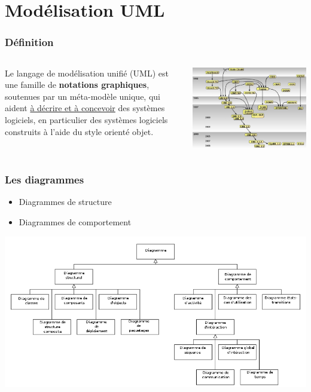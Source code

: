 \section{Modélisation UML}
\label{sec:uml}


\begin{frame}
    \frametitle{Définition}
    \begin{columns}
        \begin{column}{0.5\textwidth}
            Le langage de modélisation unifié (UML) est une famille de \textbf{notations graphiques},
            soutenues par un méta-modèle unique,
            qui aident \underline{à décrire et à concevoir} des systèmes logiciels,
            en particulier des systèmes logiciels construits à l'aide du style orienté objet.
        \end{column}
        \begin{column}{0.5\textwidth}
            \centering
            \includegraphics[width=\linewidth]{figures/uml/uml-historie}
        \end{column}
    \end{columns}
\end{frame}

\begin{frame}
    \frametitle{Les diagrammes}
    \begin{itemize}
        \item Diagrammes de structure
        \item Diagrammes de comportement
    \end{itemize}
    \centering
    \includegraphics[height=0.4\linewidth]{figures/uml/uml-diagrammes}
\end{frame}

